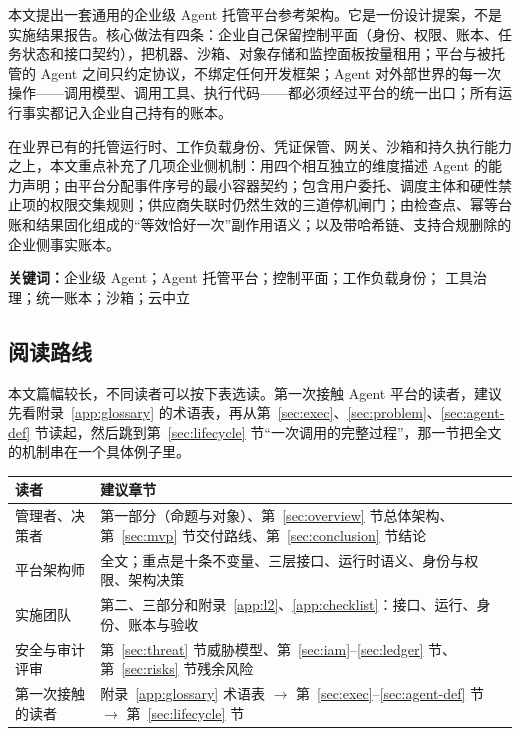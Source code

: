 本文提出一套通用的企业级 Agent 托管平台参考架构。它是一份设计提案，不是实施结果报告。核心做法有四条：企业自己保留控制平面（身份、权限、账本、任务状态和接口契约），把机器、沙箱、对象存储和监控面板按量租用；平台与被托管的 Agent 之间只约定协议，不绑定任何开发框架；Agent 对外部世界的每一次操作——调用模型、调用工具、执行代码——都必须经过平台的统一出口；所有运行事实都记入企业自己持有的账本。

在业界已有的托管运行时、工作负载身份、凭证保管、网关、沙箱和持久执行能力之上，本文重点补充了几项企业侧机制：用四个相互独立的维度描述 Agent 的能力声明；由平台分配事件序号的最小容器契约；包含用户委托、调度主体和硬性禁止项的权限交集规则；供应商失联时仍然生效的三道停机闸门；由检查点、幂等台账和结果固化组成的“等效恰好一次”副作用语义；以及带哈希链、支持合规删除的企业侧事实账本。

{\small\sffamily\color{Muted}
  \textbf{\color{Ink}关键词：}企业级 Agent；Agent 托管平台；控制平面；工作负载身份；
  工具治理；统一账本；沙箱；云中立\par}

\subsection*{阅读路线}

本文篇幅较长，不同读者可以按下表选读。第一次接触 Agent 平台的读者，建议先看附录~\ref{app:glossary} 的术语表，再从第~\ref{sec:exec}、\ref{sec:problem}、\ref{sec:agent-def} 节读起，然后跳到第~\ref{sec:lifecycle} 节“一次调用的完整过程”，那一节把全文的机制串在一个具体例子里。

\begin{tabularx}{\textwidth}{@{}L{3.0cm}Y@{}}
  \toprule
  \textbf{读者} & \textbf{建议章节}\\
  \midrule
  管理者、决策者 & 第一部分（命题与对象）、第~\ref{sec:overview} 节总体架构、第~\ref{sec:mvp} 节交付路线、第~\ref{sec:conclusion} 节结论\\
  平台架构师 & 全文；重点是十条不变量、三层接口、运行时语义、身份与权限、架构决策\\
  实施团队 & 第二、三部分和附录~\ref{app:l2}、\ref{app:checklist}：接口、运行、身份、账本与验收\\
  安全与审计评审 & 第~\ref{sec:threat} 节威胁模型、第~\ref{sec:iam}--\ref{sec:ledger} 节、第~\ref{sec:risks} 节残余风险\\
  第一次接触的读者 & 附录~\ref{app:glossary} 术语表 $\rightarrow$ 第~\ref{sec:exec}--\ref{sec:agent-def} 节 $\rightarrow$ 第~\ref{sec:lifecycle} 节\\
  \bottomrule
\end{tabularx}

\newpage
\begingroup
\footnotesize
\setlength{\parskip}{0pt}
\renewcommand{\baselinestretch}{0.92}\selectfont
\tableofcontents
\vspace{1.2em}
\listoffigures
\vspace{1.2em}
\listoftables
\endgroup
\newpage
{}
